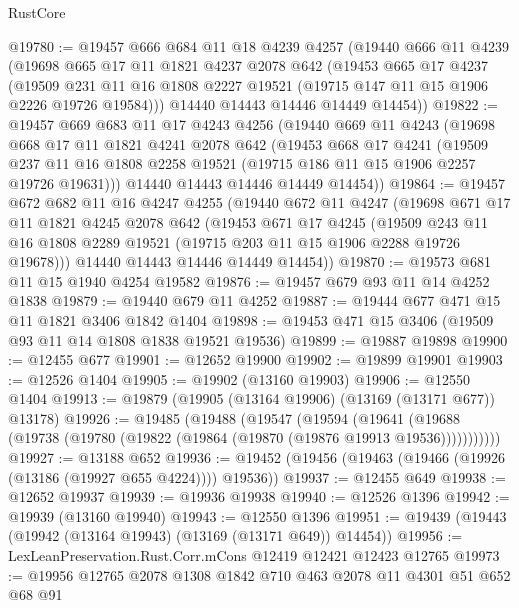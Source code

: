 \begin{lexlean}{RustCore}
\begin{coremodule}
@19780 := @19457
    @666
    @684
    @11
    @18
    @4239
    @4257
    (@19440
      @666
      @11
      @4239
      (@19698
        @665
        @17
        @11
        @1821
        @4237
        @2078
        @642
        (@19453
          @665
          @17
          @4237
          (@19509 @231 @11 @16 @1808 @2227 @19521 (@19715 @147 @11 @15 @1906 @2226 @19726 @19584)))
        @14440
        @14443
        @14446
        @14449
        @14454))
@19822 := @19457
    @669
    @683
    @11
    @17
    @4243
    @4256
    (@19440
      @669
      @11
      @4243
      (@19698
        @668
        @17
        @11
        @1821
        @4241
        @2078
        @642
        (@19453
          @668
          @17
          @4241
          (@19509 @237 @11 @16 @1808 @2258 @19521 (@19715 @186 @11 @15 @1906 @2257 @19726 @19631)))
        @14440
        @14443
        @14446
        @14449
        @14454))
@19864 := @19457
    @672
    @682
    @11
    @16
    @4247
    @4255
    (@19440
      @672
      @11
      @4247
      (@19698
        @671
        @17
        @11
        @1821
        @4245
        @2078
        @642
        (@19453
          @671
          @17
          @4245
          (@19509 @243 @11 @16 @1808 @2289 @19521 (@19715 @203 @11 @15 @1906 @2288 @19726 @19678)))
        @14440
        @14443
        @14446
        @14449
        @14454))
@19870 := @19573 @681 @11 @15 @1940 @4254 @19582
@19876 := @19457 @679 @93 @11 @14 @4252 @1838
@19879 := @19440 @679 @11 @4252
@19887 := @19444 @677 @471 @15 @11 @1821 @3406 @1842 @1404
@19898 := @19453 @471 @15 @3406 (@19509 @93 @11 @14 @1808 @1838 @19521 @19536)
@19899 := @19887 @19898
@19900 := @12455 @677
@19901 := @12652 @19900
@19902 := @19899 @19901
@19903 := @12526 @1404
@19905 := @19902 (@13160 @19903)
@19906 := @12550 @1404
@19913 := @19879 (@19905 (@13164 @19906) (@13169 (@13171 @677)) @13178)
@19926 := @19485
    (@19488
      (@19547
        (@19594
          (@19641 (@19688 (@19738 (@19780 (@19822 (@19864 (@19870 (@19876 @19913 @19536)))))))))))
@19927 := @13188 @652
@19936 := @19452 (@19456 (@19463 (@19466 (@19926 (@13186 (@19927 @655 @4224)))) @19536))
@19937 := @12455 @649
@19938 := @12652 @19937
@19939 := @19936 @19938
@19940 := @12526 @1396
@19942 := @19939 (@13160 @19940)
@19943 := @12550 @1396
@19951 := @19439 (@19443 (@19942 (@13164 @19943) (@13169 (@13171 @649)) @14454))
@19956 := LexLeanPreservation.Rust.Corr.mCons @12419 @12421 @12423 @12765
@19973 := @19956
    @12765
    @2078
    @1308
    @1842
    @710
    @463
    @2078
    @11
    @4301
    @51
    @652
    @68
    @91

\end{coremodule}
\end{lexlean}
